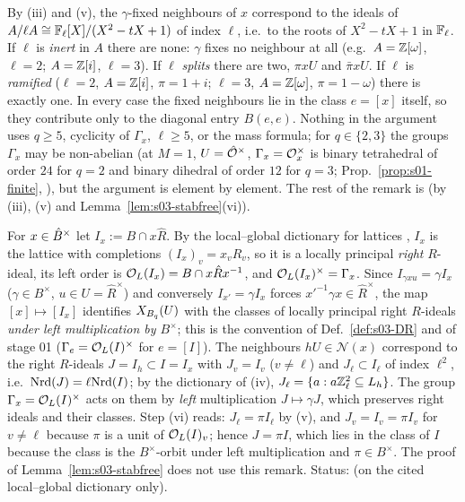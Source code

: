 \begin{remark}\label{rem:s03-eis-cases}
By (iii) and (v), the $\gamma$-fixed neighbours of $x$ correspond to the ideals of $A/\ell A\cong\mathbb{F}_\ell[X]/(X^2-tX+1)$ of index $\ell$, i.e.\ to the roots of
$X^2-tX+1$ in $\mathbb{F}_\ell$. If $\ell$ is \emph{inert} in $A$ there are none: $\gamma$ fixes no neighbour at all (e.g.\ $A=\mathbb{Z}[\omega]$, $\ell=2$; $A=\mathbb{Z}[i]$,
$\ell=3$). If $\ell$ \emph{splits} there are two, $\pi xU$ and $\bar\pi xU$. If $\ell$ is \emph{ramified} ($\ell=2$, $A=\mathbb{Z}[i]$, $\pi=1+i$; $\ell=3$,
$A=\mathbb{Z}[\omega]$, $\pi=1-\omega$) there is exactly one. In every case the fixed neighbours lie in the class $e=[x]$ itself, so they contribute only to the
diagonal entry $B(e,e)$. Nothing in the argument uses $q\ge5$, cyclicity of $\Gamma_x$, $\ell\ge5$, or the mass formula; for $q\in\{2,3\}$ the groups
$\Gamma_x$ may be non-abelian (at $M=1$, $U=\hat{\mathcal{O}}^\times$, $\Gamma_x=\mathcal{O}_x^\times$ is binary tetrahedral of order $24$ for $q=2$ and binary dihedral of
order $12$ for $q=3$; Prop.~\ref{prop:s01-finite}, \stcited{} ), but the argument is element by
element. The rest of the remark is \stproved{} (by (iii), (v) and Lemma~\ref{lem:s03-stabfree}(vi)).
\end{remark}

\begin{remark}\label{rem:s03-eis-ideals}
For $x\in\hat{B}^\times$ let $I_x:=B\cap x\hat R$. By the local--global dictionary for lattices \stcited{}
, $I_x$ is the lattice with completions $(I_x)_v=x_vR_v$, so it is a locally principal \emph{right}
$R$-ideal, its left order is $\mathcal{O}_L(I_x)=B\cap x\hat Rx^{-1}$, and $\mathcal{O}_L(I_x)^\times=\Gamma_x$. Since $I_{\gamma xu}=\gamma I_x$ ($\gamma\in B^\times$,
$u\in U=\hat R^\times$) and conversely $I_{x'}=\gamma I_x$ forces $x'^{-1}\gamma x\in\hat R^\times$, the map $[x]\mapsto[I_x]$ identifies $X_{B_q}(U)$ with the
classes of locally principal right $R$-ideals \emph{under left multiplication by $B^\times$}; this is the convention of Def.~\ref{def:s03-DR} and of
stage 01 ($\Gamma_e=\mathcal{O}_L(I)^\times$ for $e=[I]$). The neighbours $hU\in\mathcal N(x)$ correspond to the right $R$-ideals $J=I_h\subset I=I_x$ with
$J_v=I_v$ ($v\ne\ell$) and $J_\ell\subset I_\ell$ of index $\ell^2$, i.e.\ $\mathrm{Nrd}(J)=\ell\mathrm{Nrd}(I)$; by the dictionary of (iv), $J_\ell=\{a:a\mathbb{Z}_\ell^2\subseteq L_h\}$.
The group $\Gamma_x=\mathcal{O}_L(I)^\times$ acts on them by \emph{left} multiplication $J\mapsto\gamma J$, which preserves right ideals and their classes. Step (vi)
reads: $J_\ell=\pi I_\ell$ by (v), and $J_v=I_v=\pi I_v$ for $v\ne\ell$ because $\pi$ is a unit of $\mathcal{O}_L(I)_v$; hence $J=\pi I$, which lies in the class of $I$
because the class is the $B^\times$-orbit under left multiplication and $\pi\in B^\times$. The proof of Lemma~\ref{lem:s03-stabfree} does not use this remark.
Status: \stpmc{} (on the cited local--global dictionary only).
\end{remark}

